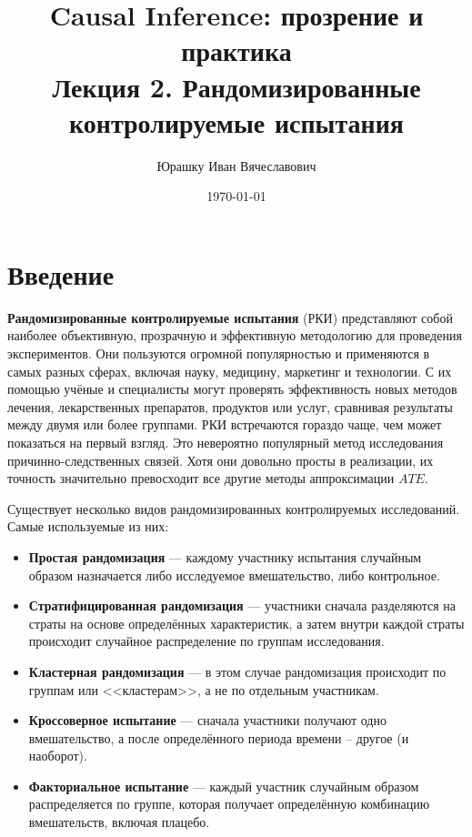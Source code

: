 

\newcommand{\coursename}{Causal Inference: прозрение и практика}
\title{
    \textbf{\coursename}\\
    Лекция 2. Рандомизированные контролируемые испытания
}
\author{Юрашку Иван Вячеславович}
\date{\today}



    \maketitle

    \section*{Введение}

    \textbf{Рандомизированные контролируемые испытания} (РКИ) представляют собой наиболее объективную, прозрачную и эффективную методологию для проведения экспериментов.
    Они пользуются огромной популярностью и применяются в самых разных сферах, включая науку, медицину, маркетинг и технологии.
    С их помощью учёные и специалисты могут проверять эффективность новых методов лечения, лекарственных препаратов, продуктов или услуг, сравнивая результаты между двумя или более группами.
    РКИ встречаются гораздо чаще, чем может показаться на первый взгляд.
    Это невероятно популярный метод исследования причинно-следственных связей.
    Хотя они довольно просты в реализации, их точность значительно превосходит все другие методы аппроксимации $ATE$.


    Существует несколько видов рандомизированных контролируемых исследований.
    Самые используемые из них:

    \begin{itemize}
        \item \textbf{Простая рандомизация} --- каждому участнику испытания случайным образом назначается либо исследуемое вмешательство, либо контрольное.
        \item \textbf{Стратифицированная рандомизация} --- участники сначала разделяются на страты на основе определённых характеристик, а затем внутри каждой страты происходит случайное распределение по группам исследования.
        \item \textbf{Кластерная рандомизация} --- в этом случае рандомизация происходит по группам или <<кластерам>>, а не по отдельным участникам.
        \item \textbf{Кроссоверное испытание} --- сначала участники получают одно вмешательство, а после определённого периода времени -- другое (и наоборот).
        \item \textbf{Факториальное испытание} --- каждый участник случайным образом распределяется по группе, которая получает определённую комбинацию вмешательств, включая плацебо.
    \end{itemize}

